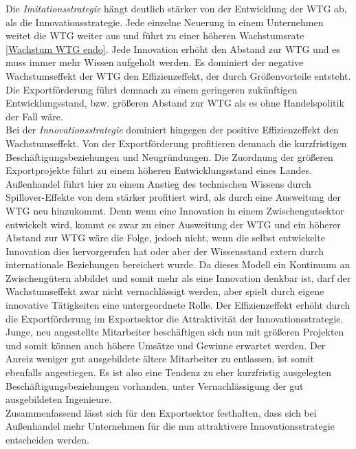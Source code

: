 %
Die \textit{Imitationsstrategie} hängt deutlich stärker von der Entwicklung der WTG ab, als die Innovationsstrategie. Jede einzelne Neuerung in einem Unternehmen weitet die WTG weiter aus und führt zu einer höheren Wachstumsrate \eqref{Wachstum WTG endo}. Jede Innovation erhöht den Abstand zur WTG und es muss immer mehr Wissen aufgeholt werden. Es dominiert der negative Wachstumseffekt der WTG den Effizienzeffekt, der durch Größenvorteile entsteht. Die Exportförderung führt demnach zu einem geringeren zukünftigen Entwicklungsstand, bzw. größeren Abstand zur WTG als es ohne Handelspolitik der Fall wäre.\\
%
Bei der \textit{Innovationsstrategie} dominiert hingegen der positive Effizienzeffekt den Wachstumseffekt. Von der Exportförderung profitieren demnach die kurzfristigen Beschäftigungsbeziehungen und Neugründungen. Die Zuordnung der größeren Exportprojekte führt zu einem höheren Entwicklungsstand eines Landes. Außenhandel führt hier zu einem Anstieg des technischen Wissens durch Spillover-Effekte von dem stärker profitiert wird, als durch eine Ausweitung der WTG neu hinzukommt. Denn wenn eine Innovation in einem Zwischengutsektor entwickelt wird, kommt es zwar zu einer Ausweitung der WTG und ein höherer Abstand zur WTG wäre die Folge, jedoch nicht, wenn die selbst entwickelte Innovation dies hervorgerufen hat oder aber der Wissensstand extern durch internationale Beziehungen bereichert wurde. Da dieses Modell ein Kontinuum an Zwischengütern abbildet und somit mehr als eine Innovation denkbar ist, darf der Wachstumseffekt zwar nicht vernachlässigt werden, aber spielt durch eigene innovative Tätigkeiten eine untergeordnete Rolle. Der Effizienzeffekt erhöht durch die Exportförderung im Exportsektor die Attraktivität der Innovationsstrategie. Junge, neu angestellte Mitarbeiter beschäftigen sich nun mit größeren Projekten und somit können auch höhere Umsätze und Gewinne erwartet werden. Der Anreiz weniger gut ausgebildete ältere Mitarbeiter zu entlassen, ist somit ebenfalls angestiegen. Es ist also eine Tendenz zu eher kurzfristig ausgelegten Beschäftigungsbeziehungen vorhanden, unter Vernachlässigung der gut ausgebildeten Ingenieure.\\
%
Zusammenfassend lässt sich für den Exportsektor festhalten, dass sich bei Außenhandel mehr Unternehmen für die nun attraktivere Innovationsstrategie entscheiden werden.\\
%
